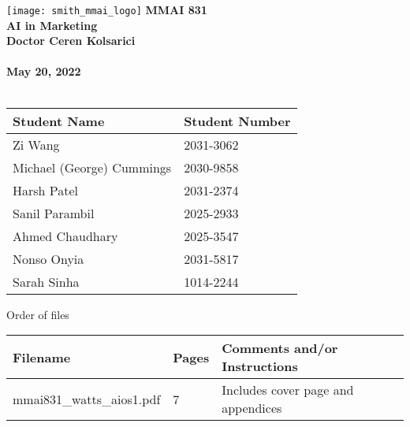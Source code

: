 \begin{titlepage}
  \raggedleft
  \texttt{[image: smith\_mmai\_logo]}
  \centering
  \vfill
  {\bfseries\large
    MMAI 831 \\
    AI in Marketing\\
    \vspace{2em}
    Doctor Ceren Kolsarici \\
    \vspace{4em}
    \@title \\
    May 20, 2022\\
  }
  \vspace{2em}
  \textbf{\@author} \\
  \vspace{1em}
	\begin{tabular}{|p{3.5in}|p{2.0in}|}
	\hline
	Student Name & Student Number \\
	\hline
	Zi Wang	& 2031-3062 \\
	Michael (George) Cummings & 2030-9858\\
	Harsh Patel & 2031-2374 \\
	Sanil Parambil & 2025-2933 \\
	Ahmed Chaudhary & 2025-3547 \\
	Nonso Onyia & 2031-5817 \\
	Sarah Sinha & 1014-2244 \\
	\hline
  \end{tabular}

  \vspace{2em}
  Order of files \\
  \vspace{1em}
  \begin{tabular}{|p{2.0in}|p{.5in}|p{3.0in}|}
	\hline
	Filename & Pages & Comments and/or Instructions \\
	\hline
	mmai831\_watts\_aios1.pdf & 7 & Includes cover page and appendices \\
	\hline
  \end{tabular}
  \vfill
\end{titlepage}
